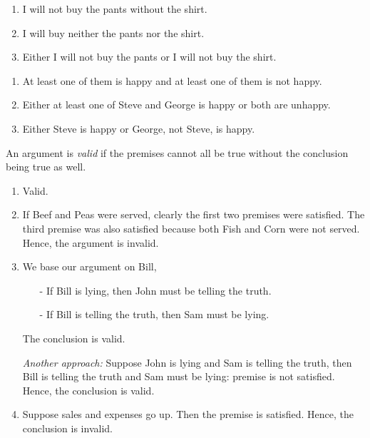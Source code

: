 \begin{exx}
  \begin{enumerate}[label=(\alph*)]
    \item I will not buy the pants without the shirt.
    \item I will buy neither the pants nor the shirt.
    \item Either I will not buy the pants or I will not buy the shirt.
  \end{enumerate}
\end{exx}

\begin{exx}
  \begin{enumerate}[label=(\alph*)]
    \item At least one of them is happy and at least one of them is not happy.
    \item Either at least one of Steve and George is happy or both are unhappy.
    \item Either Steve is happy or George, not Steve, is happy.
  \end{enumerate}
\end{exx}

\begin{exx}
  \begin{cd}
    An argument is \emph{valid} if the premises cannot all be true without the conclusion
    being true as well.
  \end{cd}
  \begin{enumerate}[label=(\alph*)]
    \item Valid.
    \item If Beef and Peas were served, clearly the first two premises were satisfied.
    The third premise was also satisfied because both Fish and Corn were not served. Hence,
    the argument is invalid.
    \item We base our argument on Bill,
    \begin{enumerate}
      \item[-] If Bill is lying, then John must be telling the truth.
      \item[-] If Bill is telling the truth, then Sam must be lying.
    \end{enumerate}
    The conclusion is valid. \par
    \emph{Another approach:} Suppose John is lying and Sam is telling the truth, then Bill is
    telling the truth and Sam must be lying: premise is not satisfied. Hence, the conclusion
    is valid.
    \item Suppose sales and expenses go up. Then the premise is satisfied. Hence,
    the conclusion is invalid.
  \end{enumerate}
\end{exx}

